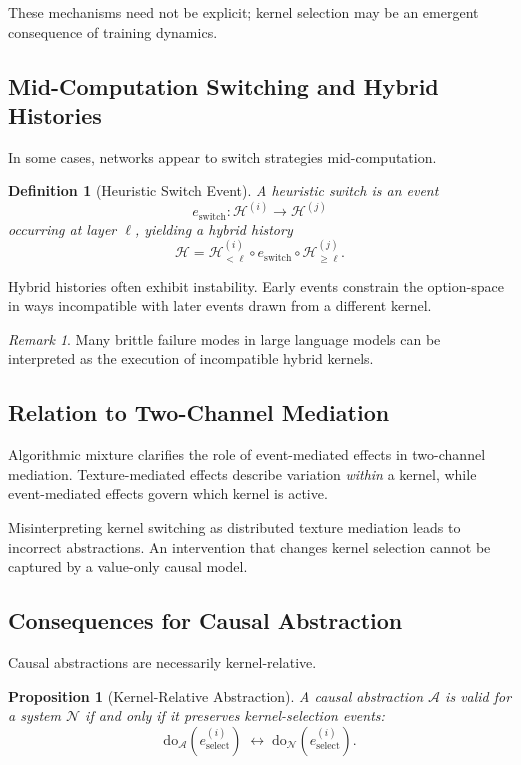 \documentclass[11pt]{article}
\newtheorem{definition}{Definition}
\newtheorem{proposition}{Proposition}
\theoremstyle{remark}
\newtheorem{remark}{Remark}
\newcommand{\Hist}{\mathcal{H}}
\newcommand{\NN}{\mathcal{N}}
\newcommand{\Alg}{\mathcal{A}}
\newcommand{\Do}{\mathrm{do}}
\begin{document}
These mechanisms need not be explicit; kernel selection may be an
emergent consequence of training dynamics.

\subsection{Mid-Computation Switching and Hybrid Histories}

In some cases, networks appear to switch strategies mid-computation.

\begin{definition}[Heuristic Switch Event]
A heuristic switch is an event
\[
e_{\text{switch}} : \Hist^{(i)} \to \Hist^{(j)}
\]
occurring at layer $\ell$, yielding a hybrid history
\[
\Hist = \Hist^{(i)}_{<\ell} \circ e_{\text{switch}} \circ
\Hist^{(j)}_{\ge \ell}.
\]
\end{definition}

Hybrid histories often exhibit instability. Early events constrain the
option-space in ways incompatible with later events drawn from a
different kernel.

\begin{remark}
Many brittle failure modes in large language models can be interpreted
as the execution of incompatible hybrid kernels.
\end{remark}

\subsection{Relation to Two-Channel Mediation}

Algorithmic mixture clarifies the role of event-mediated effects in
two-channel mediation. Texture-mediated effects describe variation
\emph{within} a kernel, while event-mediated effects govern which kernel
is active.

Misinterpreting kernel switching as distributed texture mediation leads
to incorrect abstractions. An intervention that changes kernel
selection cannot be captured by a value-only causal model.

\subsection{Consequences for Causal Abstraction}

Causal abstractions are necessarily kernel-relative.

\begin{proposition}[Kernel-Relative Abstraction]
A causal abstraction $\Alg$ is valid for a system $\NN$ if and only if
it preserves kernel-selection events:
\[
\Do_{\Alg}(e_{\text{select}}^{(i)}) \;\leftrightarrow\;
\Do_{\NN}(e_{\text{select}}^{(i)}).
\]
\end{proposition}
\end{document}
